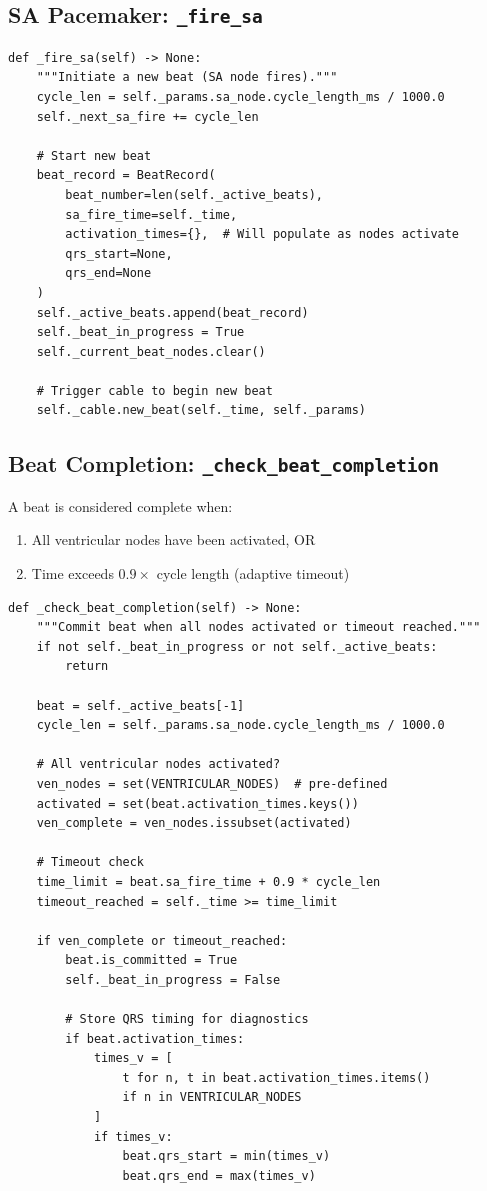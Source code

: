 \documentclass[12pt,a4paper,oneside]{book}
\begin{document}
\subsection{SA Pacemaker: \texttt{\_fire\_sa}}

\begin{Verbatim}[formatcom=\color{black}]
def _fire_sa(self) -> None:
    """Initiate a new beat (SA node fires)."""
    cycle_len = self._params.sa_node.cycle_length_ms / 1000.0
    self._next_sa_fire += cycle_len
    
    # Start new beat
    beat_record = BeatRecord(
        beat_number=len(self._active_beats),
        sa_fire_time=self._time,
        activation_times={},  # Will populate as nodes activate
        qrs_start=None,
        qrs_end=None
    )
    self._active_beats.append(beat_record)
    self._beat_in_progress = True
    self._current_beat_nodes.clear()
    
    # Trigger cable to begin new beat
    self._cable.new_beat(self._time, self._params)
\end{Verbatim}

\subsection{Beat Completion: \texttt{\_check\_beat\_completion}}

A beat is considered complete when:
\begin{enumerate}
    \item All ventricular nodes have been activated, OR
    \item Time exceeds $0.9 \times$ cycle length (adaptive timeout)
\end{enumerate}

\begin{Verbatim}[formatcom=\color{black}]
def _check_beat_completion(self) -> None:
    """Commit beat when all nodes activated or timeout reached."""
    if not self._beat_in_progress or not self._active_beats:
        return
    
    beat = self._active_beats[-1]
    cycle_len = self._params.sa_node.cycle_length_ms / 1000.0
    
    # All ventricular nodes activated?
    ven_nodes = set(VENTRICULAR_NODES)  # pre-defined
    activated = set(beat.activation_times.keys())
    ven_complete = ven_nodes.issubset(activated)
    
    # Timeout check
    time_limit = beat.sa_fire_time + 0.9 * cycle_len
    timeout_reached = self._time >= time_limit
    
    if ven_complete or timeout_reached:
        beat.is_committed = True
        self._beat_in_progress = False
        
        # Store QRS timing for diagnostics
        if beat.activation_times:
            times_v = [
                t for n, t in beat.activation_times.items()
                if n in VENTRICULAR_NODES
            ]
            if times_v:
                beat.qrs_start = min(times_v)
                beat.qrs_end = max(times_v)
\end{Verbatim}
\end{document}
